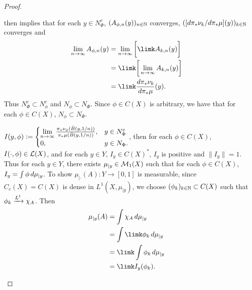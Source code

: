 \documentclass{book}
\begin{document}
\begin{proof}
\begin{itemize}
		
		 then implies that for each $y \in N_{\Phi}^c$, $(A_{\phi, n}(y))_{n \in \mathbb{N}}$ converges, $([d\pi_*\nu_k/d\pi_*\mu](y))_{k \in \mathbb{N}}$ converges and
		\begin{align*}
			\limn A_{\phi, n}(y)
			& = \limn \bigg[ \limk A_{k, n}(y) \bigg] \\
			& = \limk \bigg[ \limn A_{k, n}(y) \bigg] \\
			& = \limk \frac{d\pi_*\nu_k}{d\pi_*\mu}(y). 
		\end{align*}
		Thus $N_{\Phi}^c \subset N_{\phi}^c$ and $N_{\phi} \subset N_{\Phi}$. Since $\phi \in C(X)$ is arbitrary, we have that for each $\phi \in C(X)$, $N_{\phi} \subset N_{\Phi}$. 
		
		 $I(y, \phi) \vcentcolon= 
		\begin{cases}
			\lim \limits_{n \rightarrow \infty} \frac{\pi_*\nu_{\phi}(\bar{B}(y, 1/n))}{\pi_*\mu(\bar{B}(y, 1/n))}, & y \in N_{\Phi}^c \\
			0, & y \in N_{\Phi}. 
		\end{cases}
		$, then for each $\phi \in C(X)$, $I(\cdot, \phi) \in \mathcal{L}(X)$, and for each $y \in Y$, $I_y \in C(X)^*$, $I_y$ is positive and $\|I_y\| = 1$. Thus for each $y \in Y$, there exists $\mu_{|y} \in \mathcal{M}_1(X)$ such that for each $\phi \in C(X)$, $I_y = \int \phi \, d \mu_{|y}$. To show $\mu_{|\cdot}(A):Y \rightarrow [0,1]$ is measurable, since $C_c(X) = C(X)$ is dense in $L^1(X, \mu_{|y})$, we choose $(\phi_k)_{k \in \mathbb{N}} \subset C(X)$ such that $\phi_k \xrightarrow{L^1} \chi_A$. Then
		\begin{align*}
			\mu_{|y}(A)
			& = \int \chi_A \dmu_{|y} \\
			& = \int \limk \phi_k \dmu_{|y} \\
			& = \limk \int \phi_k \dmu_{|y} \\
			& = \limk I_y(\phi_k).
		\end{align*}
		

\end{itemize}
\end{proof}
\end{document}
